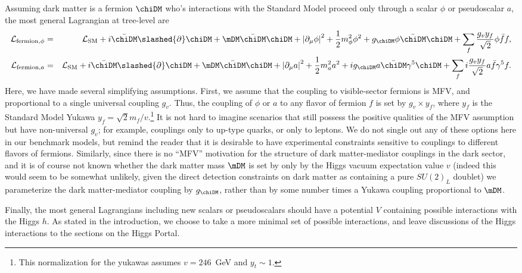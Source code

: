 Assuming dark matter is a fermion $\chiDM$ who's interactions with the Standard Model proceed only through a scalar $\phi$ or pseudoscalar $a$, the most general Lagrangian at tree-level are
\begin{eqnarray}
{\cal L}_{{\rm fermion},\phi} & = & {\cal L}_{\rm SM}+i\bar{\chiDM} \slashed{\partial} \chiDM + \mDM \bar{\chiDM}\chiDM + \left| \partial_\mu \phi \right|^2+\frac{1}{2}m_\phi^2 \phi^2 + g_\chiDM \phi \bar{\chiDM}\chiDM+ \sum_f \frac{g_v y_f}{\sqrt{2}} \phi \bar{f} f, \label{eq:scalarlag} \\
{\cal L}_{{\rm fermion},a} & = & {\cal L}_{\rm SM}+i\bar{\chiDM} \slashed{\partial} \chiDM + \mDM \bar{\chiDM}\chiDM + \left| \partial_\mu a \right|^2+\frac{1}{2}m_a^2 a^2 + i g_\chiDM a \bar{\chiDM}\gamma^5 \chiDM+ \sum_f i \frac{g_v y_f}{\sqrt{2}} a \bar{f}\gamma^5 f. \label{eq:pseudoscalarlag}
\end{eqnarray}
Here, we have made several simplifying assumptions. First, we assume that the coupling to visible-sector fermions is MFV, and proportional to a single universal coupling $g_v$. Thus, the coupling of $\phi$ or $a$ to any flavor of fermion $f$ is set by $g_v \times y_f$, where $y_f$ is the Standard Model Yukawa $y_f = \sqrt{2}m_f/v$.\footnote{This normalization for the yukawas assumes $v = 246$~GeV and $y_t \sim 1$.} It is not hard to imagine scenarios that still possess the positive qualities of the MFV assumption but have non-universal $g_v$; for example, couplings only to up-type quarks, or only to leptons. We do not single out any of these options here in our benchmark models, but remind the reader that it is desirable to have experimental constraints sensitive to couplings to different flavors of fermions. Similarly, since there is no ``MFV'' motivation for the structure of dark matter-mediator couplings in the dark sector, and it is of course not known whether the dark matter mass $\mDM$ is set by only by the Higgs vacuum expectation value $v$ (indeed this would seem to be somewhat unlikely, given the direct detection constraints on dark matter as containing a pure $SU(2)_L$ doublet) we parameterize the dark matter-mediator coupling by $g_\chiDM$, rather than by some number times a Yukawa coupling proportional to $\mDM$. 

Finally, the most general Lagrangians including new scalars or pseudoscalars should have a potential $V$ containing possible interactions with the Higgs $h$. As stated in the introduction, we choose to take a more minimal set of possible interactions, and leave discussions of the Higgs interactions to the sections on the Higgs Portal.

